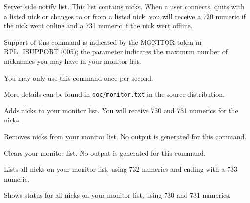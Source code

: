 	Server side notify list. This list contains nicks. When a user
	connects, quits with a listed nick or changes to or from a listed nick,
	you will receive a 730 numeric if the nick went online and a 731
	numeric if the nick went offline.

	Support of this command is indicated by the MONITOR token in
	RPL\_ISUPPORT (005); the parameter indicates the maximum number of
	nicknames you may have in your monitor list.

	You may only use this command once per second.

	More details can be found in \nolinkurl{doc/monitor.txt} in the source
	distribution.


    \literal{,}

	Adds nicks to your monitor list. You will receive 730 and 731 numerics
	for the nicks.


    \literal{,}

	Removes nicks from your monitor list. No output is generated for this
	command.



	Clears your monitor list. No output is generated for this command.



	Lists all nicks on your monitor list, using 732 numerics and ending
	with a 733 numeric.



	Shows status for all nicks on your monitor list, using 730 and 731
	numerics.
